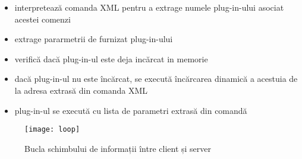 \begin{itemize}
\item interpretează comanda XML pentru a extrage numele plug-in-ului asociat acestei comenzi
\item extrage pararmetrii de furnizat plug-in-ului
\item verifică dacă plug-in-ul este deja incărcat in memorie 
\item dacă  plug-in-ul nu este încărcat, se execută încărcarea dinamică a acestuia de la adresa extrasă din comanda XML
\item plug-in-ul se execută cu lista de parametri extrasă din comandă
\end{itemize}

\begin{figure}[h]
    \centering
    \texttt{[image: loop]}
    \caption{Bucla schimbului de informații între client și server}
    \label{fig:loop}
\end{figure}